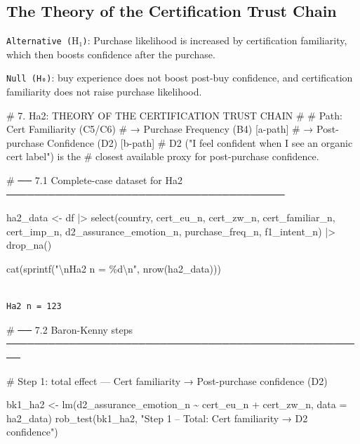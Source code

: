 \documentclass[
  letterpaper,
  DIV=11,
  numbers=noendperiod]{scrartcl}
\newenvironment{Shaded}{\begin{snugshade}}{\end{snugshade}}
\newcommand{\AttributeTok}[1]{\textcolor[rgb]{0.40,0.45,0.13}{#1}}
\newcommand{\CommentTok}[1]{\textcolor[rgb]{0.37,0.37,0.37}{#1}}
\newcommand{\FunctionTok}[1]{\textcolor[rgb]{0.28,0.35,0.67}{#1}}
\newcommand{\NormalTok}[1]{\textcolor[rgb]{0.00,0.23,0.31}{#1}}
\newcommand{\OtherTok}[1]{\textcolor[rgb]{0.00,0.23,0.31}{#1}}
\newcommand{\SpecialCharTok}[1]{\textcolor[rgb]{0.37,0.37,0.37}{#1}}
\newcommand{\StringTok}[1]{\textcolor[rgb]{0.13,0.47,0.30}{#1}}
\begin{document}
\subsection{The Theory of the Certification Trust
Chain}\label{the-theory-of-the-certification-trust-chain}

\texttt{Alternative\ (}H₁\texttt{)}: Purchase likelihood is increased by
certification familiarity, which then boosts confidence after the
purchase.

\texttt{Null\ (\textasciigrave{}\textasciigrave{}H₀\textasciigrave{}\textasciigrave{})}:
buy experience does not boost post-buy confidence, and certification
familiarity does not raise purchase likelihood.

\begin{Shaded}
\begin{Highlighting}[]
\CommentTok{\# 7.  Ha2: THEORY OF THE CERTIFICATION TRUST CHAIN}
\CommentTok{\#}
\CommentTok{\#  Path:  Cert Familiarity (C5/C6)}
\CommentTok{\#            → Purchase Frequency (B4)          [a{-}path]}
\CommentTok{\#            → Post{-}purchase Confidence (D2)    [b{-}path]}
\CommentTok{\#  D2 ("I feel confident when I see an organic cert label") is the}
\CommentTok{\#  closest available proxy for post{-}purchase confidence.}


\CommentTok{\# ── 7.1  Complete{-}case dataset for Ha2 ────────────────────────────────────────}

\NormalTok{ha2\_data }\OtherTok{\textless{}{-}}\NormalTok{ df }\SpecialCharTok{|\textgreater{}}
  \FunctionTok{select}\NormalTok{(country, cert\_eu\_n, cert\_zw\_n, cert\_familiar\_n,}
\NormalTok{         cert\_imp\_n, d2\_assurance\_emotion\_n, purchase\_freq\_n, f1\_intent\_n) }\SpecialCharTok{|\textgreater{}}
  \FunctionTok{drop\_na}\NormalTok{()}

\FunctionTok{cat}\NormalTok{(}\FunctionTok{sprintf}\NormalTok{(}\StringTok{"}\SpecialCharTok{\textbackslash{}n}\StringTok{Ha2 n = \%d}\SpecialCharTok{\textbackslash{}n}\StringTok{"}\NormalTok{, }\FunctionTok{nrow}\NormalTok{(ha2\_data)))}
\end{Highlighting}
\end{Shaded}

\begin{verbatim}

Ha2 n = 123
\end{verbatim}

\begin{Shaded}
\begin{Highlighting}[]
\CommentTok{\# ── 7.2  Baron{-}Kenny steps ────────────────────────────────────────────────────}

\CommentTok{\# Step 1: total effect — Cert familiarity → Post{-}purchase confidence (D2)}

\NormalTok{bk1\_ha2 }\OtherTok{\textless{}{-}} \FunctionTok{lm}\NormalTok{(d2\_assurance\_emotion\_n }\SpecialCharTok{\textasciitilde{}}\NormalTok{ cert\_eu\_n }\SpecialCharTok{+}\NormalTok{ cert\_zw\_n, }\AttributeTok{data =}\NormalTok{ ha2\_data)}
\FunctionTok{rob\_test}\NormalTok{(bk1\_ha2, }\StringTok{"Step 1 – Total: Cert familiarity → D2 confidence"}\NormalTok{)}
\end{Highlighting}
\end{Shaded}
\end{document}
